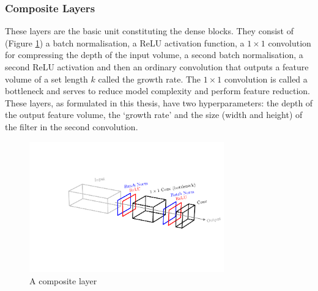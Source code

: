 \subsubsection{Composite Layers}
These layers are the basic unit constituting the dense blocks. They consist of (Figure \ref{fig:machine_learning:composite_layer}) a batch normalisation, a ReLU activation function, a $1\times{}1$ convolution for compressing the depth of the input volume, a second batch normalisation, a second ReLU activation and then an ordinary convolution that outputs a feature volume of a set length $k$ called the growth rate. The $1\times{}1$ convolution is called a bottleneck and serves to reduce model complexity and perform feature reduction. These layers, as formulated in this thesis, have two hyperparameters: the depth of the output feature volume, the `growth rate' and the size (width and height) of the filter in the second convolution. 
\begin{figure}[h!]
    \includegraphics[width=0.75\textwidth]{figures/machine_learning/composite_layer.pdf}
    \caption{A composite layer}
        \label{fig:machine_learning:composite_layer}
\end{figure}


